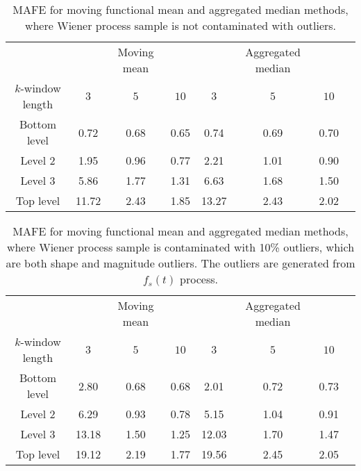\documentclass[12pt,a4paper]{article}
\numberwithin{equation}{section}
\begin{document}
\begin{table}
\caption{MAFE for moving functional mean and aggregated median methods, where Wiener process sample is not contaminated with outliers.}
\label{tab:wiener} 
\begin{center}
\begin{small}
\begin{tabular}{c|ccc|cccc}\hline
\noalign{\smallskip}
 & &Moving mean&  &  &Aggregated median&  \\
	$k$-window length& $3$ & $5$ & $10$ & $3$ &$5$ & $10$ \\\hline
	Bottom level & 0.72
 & 0.68
 &0.65
&0.74
 & 0.69
&0.70
\\
	Level 2 &1.95
& 0.96
 & 0.77
& 2.21
 & 1.01
 & 0.90
 \\
	Level 3 &5.86
  &1.77
& 1.31
& 6.63
 & 1.68
&  1.50
\\
    Top level & 11.72
 & 2.43
 & 1.85
& 13.27
 & 2.43
 &  2.02
 \\
\hline	
\end{tabular}
\end{small}
\end{center}
\end{table}
\begin{table}
\caption{MAFE for moving functional mean and aggregated median methods, where Wiener process sample is contaminated with 10\% outliers, which are both shape and magnitude outliers. The outliers are generated from $f_s(t)$ process.}
\label{tab:wiener10} 
\begin{center}
\begin{small}
\begin{tabular}{c|ccc|cccc}\hline
\noalign{\smallskip}
 & &Moving mean&  &  &Aggregated median&  \\
	$k$-window length& $3$ & $5$ & $10$ & $3$ &$5$ & $10$ \\\hline
	Bottom level &  2.80

& 0.68
 & 0.68
 &2.01 & 0.72
 &  0.73
\\
	Level 2 &6.29
&  0.93
 & 0.78
&5.15
 & 1.04
& 0.91
  \\
	Level 3 & 13.18
 &1.50
& 1.25
 &12.03
 & 1.70
 &  1.47
\\
    Top level & 19.12
 & 2.19
 &  1.77
& 19.56
& 2.45
 &  2.05
 \\
\hline	
\end{tabular}
\end{small}
\end{center}
\end{table}
\end{document}
